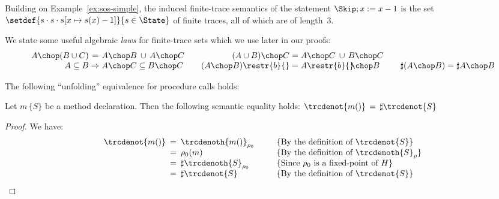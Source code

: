 \documentclass[a4paper,numberwithinsect]{lipics-v2021}
\begin{document}
\begin{example}
  Building on Example~\ref{ex:sos-simple}, the induced finite-trace
  semantics of the statement $\Skip ; x := x-1$ is the set
  $
    \setdef{s \cdot s \cdot s[x \mapsto s(x) - 1]}{s \in \State}
  $
  of finite traces, all of which are of length~$3$.
\end{example}

We state some useful algebraic \emph{laws} for finite-trace sets which
we use later in our proofs:
%
$$
\begin{array}{r@{\;}c@{\;}l@{\qquad}r@{\;}c@{\;}l@{\qquad}r@{\;}c@{\;}l}
  A \chop (B \cup C) & = & A \chop B \>\cup\, A \chop C &
   (A \cup B) \chop C & = & A \chop C \>\cup\, B \chop C \\
   A \subseteq B & \Rightarrow & A \chop C \subseteq B \chop C & 
   (A \chop B) \restr{b}{} & = & A \restr{b}{} \!\!\chop B  &
   \sharp (A \chop B) & = & \sharp A \chop B \\     
\end{array}
$$

The following ``unfolding'' equivalence for procedure calls holds:

\begin{proposition}
\label{prop:call-unfolding-2}
Let $m\,\{S\}$ be a method declaration. Then the following semantic
equality holds:
$
  \trcdenot{m()} \,=\, \sharp \trcdenot{S} 
$
\end{proposition}

\begin{proof}%
We have:
%
$$ \begin{array}{r@{\;}c@{\;}ll}
   \trcdenot{m()} & \>=\> & \trcdenoth{m()}_{\rho_0} &~~~~~
      \{\mbox{By the definition of $\trcdenot{S}$}\} \\
   & = & \rho_0 (m) &~~~~~
      \{\mbox{By the definition of $\trcdenoth{S}_{\rho}$}\} \\
   & = & \sharp \trcdenoth{S}_{\rho_0} &~~~~~
      \{\mbox{Since $\rho_0$ is a fixed-point of $H$}\} \\
   & = & \sharp \trcdenot{S} &~~~~~
      \{\mbox{By the definition of $\trcdenot{S}$}\} \\
   \end{array} $$
\end{proof}
\end{document}
